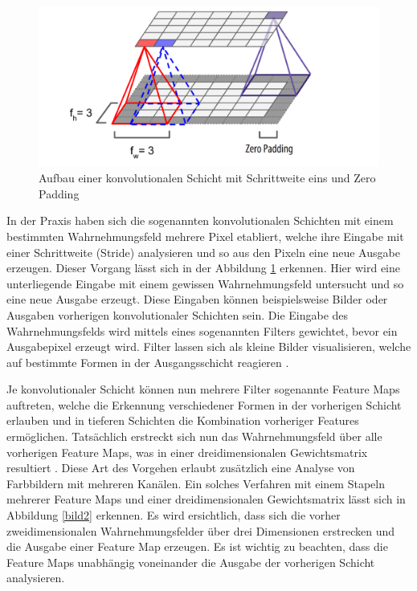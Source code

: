 \documentclass[twoside,a4paper]{IEEEtran}
\begin{document}
\begin{figure}[!htb]
	\includegraphics[width=\columnwidth]{cnn}
	\caption{Aufbau einer konvolutionalen Schicht mit Schrittweite eins und Zero Padding \cite[S.362]{MACHINE_LEARNING}}
	\label{bild1}
\end{figure}

In der Praxis haben sich die sogenannten konvolutionalen Schichten mit einem bestimmten Wahrnehmungsfeld mehrere Pixel etabliert, welche  ihre Eingabe mit einer Schrittweite (Stride) analysieren und so aus den Pixeln eine neue Ausgabe erzeugen. Dieser Vorgang lässt sich in der Abbildung \ref{bild1} erkennen. Hier wird eine unterliegende Eingabe mit einem gewissen Wahrnehmungsfeld untersucht und so eine neue Ausgabe erzeugt. Diese Eingaben können beispielsweise Bilder oder Ausgaben vorherigen konvolutionaler Schichten sein. Die Eingabe des Wahrnehmungsfelds wird mittels eines sogenannten Filters gewichtet, bevor ein Ausgabepixel erzeugt wird. Filter lassen sich als kleine Bilder visualisieren, welche auf bestimmte Formen in der Ausgangsschicht reagieren \cite[S.361-363]{MACHINE_LEARNING}. 

Je konvolutionaler Schicht können nun mehrere Filter sogenannte Feature Maps auftreten, welche die Erkennung verschiedener Formen in der vorherigen Schicht erlauben und in tieferen Schichten die Kombination vorheriger Features ermöglichen. Tatsächlich erstreckt sich nun das Wahrnehmungsfeld über alle vorherigen Feature Maps, was in einer dreidimensionalen Gewichtsmatrix resultiert \cite[S.364-365]{MACHINE_LEARNING}. Diese Art des Vorgehen erlaubt zusätzlich eine Analyse von Farbbildern mit mehreren Kanälen. Ein solches Verfahren mit einem Stapeln mehrerer Feature Maps und einer dreidimensionalen Gewichtsmatrix lässt sich in Abbildung \ref{bild2} erkennen. Es wird ersichtlich, dass sich die vorher zweidimensionalen Wahrnehmungsfelder über drei Dimensionen erstrecken und die Ausgabe einer Feature Map erzeugen. Es ist wichtig zu beachten, dass die Feature Maps unabhängig voneinander die Ausgabe der vorherigen Schicht analysieren. 
\end{document}
